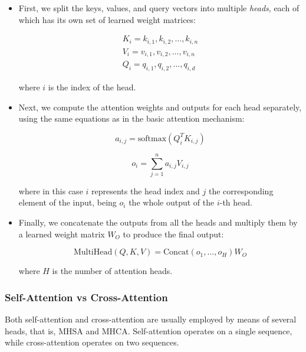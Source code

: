 \begin{itemize}
	\item First, we split the keys, values, and query vectors into multiple \textit{heads}, each of which has its own set of learned weight matrices:
	
	\begin{equation}
		\begin{split}
			K_i = {k_{i,1}, k_{i,2}, ..., k_{i,n}} \\
			V_i = {v_{i,1}, v_{i,2}, ..., v_{i,n}} \\
			Q_i = {q_{i,1}, q_{i,2}, ..., q_{i,d}}
		\end{split}
	\end{equation}
	
	where $i$ is the index of the head. 
	
	\item Next, we compute the attention weights and outputs for each head separately, using the same equations as in the basic attention mechanism:
	
	\begin{equation}
		a_{i,j} = \text{softmax}(Q_i^T K_{i,j})
	\end{equation}
	
	\begin{equation}
		o_{i} = \sum_{j=1}^{n} a_{i,j} V_{i,j}
	\end{equation}

	where in this case $i$ represents the head index and $j$ the corresponding element of the input, being $o_{i}$ the whole output of the $i$-th head.
	
	\item Finally, we concatenate the outputs from all the heads and multiply them by a learned weight matrix $W_{O}$ to produce the final output:
	
	\begin{equation}
		\text{MultiHead}(Q, K, V) = \text{Concat}(o_{1}, \dots, o_{H})W_{O}
	\end{equation}
	
	where $H$ is the number of attention heads.
\end{itemize}

\subsubsection{Self-Attention vs Cross-Attention}
\label{subsubsec:3_self_attention_vs_cross_attention}

Both self-attention and cross-attention are usually employed by means of several heads, that is, \acf{MHSA} and \acf{MHCA}. Self-attention operates on a single sequence, while cross-attention operates on two sequences. 

